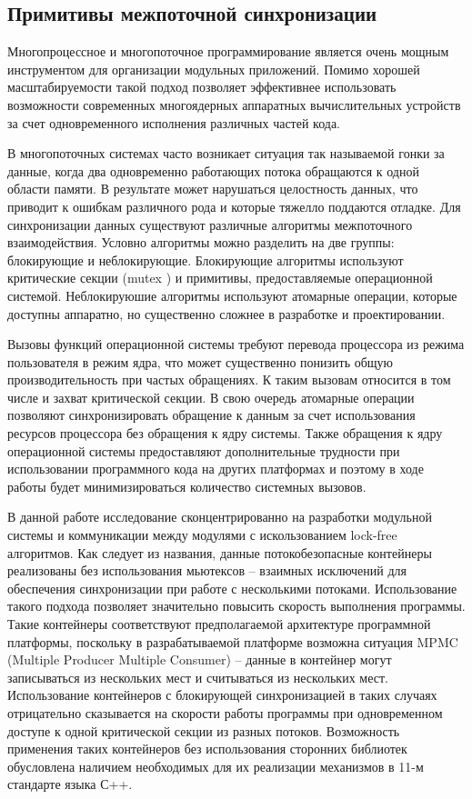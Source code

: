 \subsection{Примитивы межпоточной синхронизации}

Многопроцессное и многопоточное программирование является очень мощным инструментом для организации модульных приложений. Помимо хорошей масштабируемости такой подход позволяет эффективнее использовать возможности современных многоядерных аппаратных вычислительных устройств за счет одновременного исполнения различных частей кода.

В многопоточных системах часто возникает ситуация так называемой гонки за данные, когда два одновременно работающих потока обращаются к одной области памяти. В результате может нарушаться целостность данных, что приводит к ошибкам различного рода и которые тяжелло поддаются отладке. Для синхронизации данных существуют различные алгоритмы межпоточного взаимодействия. Условно алгоритмы можно разделить на две группы: блокирующие и неблокирующие. Блокирующие алгоритмы используют критические секции (mutex ) и примитивы, предоставляемые операционной системой. Неблокируюшие алгоритмы используют атомарные операции, которые доступны аппаратно, но существенно сложнее в разработке и проектировании.

Вызовы функций операционной системы требуют перевода процессора 
из режима пользователя в режим ядра, что может существенно 
понизить общую производительность при частых обращениях. К таким 
вызовам относится в том числе и захват критической секции. В 
свою очередь атомарные операции позволяют синхронизировать 
обращение к данным за счет использования ресурсов процессора без 
обращения к ядру системы. Также обращения к ядру операционной 
системы предоставляют дополнительные трудности при использовании 
программного кода на других платформах и поэтому в ходе работы 
будет минимизироваться количество системных вызовов.

В данной работе исследование сконцентрированно на разработки модульной системы и коммуникации между модулями с искользованием lock-free алгоритмов. Как следует из названия, данные потокобезопасные контейнеры реализованы без использования мьютексов – взаимных исключений для обеспечения синхронизации при работе с несколькими потоками. Использование такого подхода позволяет значительно повысить скорость выполнения программы. Такие контейнеры соответствуют предполагаемой архитектуре программной платформы, поскольку в разрабатываемой платформе возможна ситуация MPMC (Multiple Producer Multiple Consumer) – данные в контейнер могут записываться из нескольких мест и считываться из нескольких мест. Использование контейнеров с блокирующей синхронизацией в таких случаях отрицательно сказывается на скорости работы программы при одновременном доступе к одной критической секции из разных потоков. Возможность применения таких контейнеров без использования сторонних библиотек обусловлена наличием необходимых для их реализации механизмов в 11-м стандарте языка С++.

